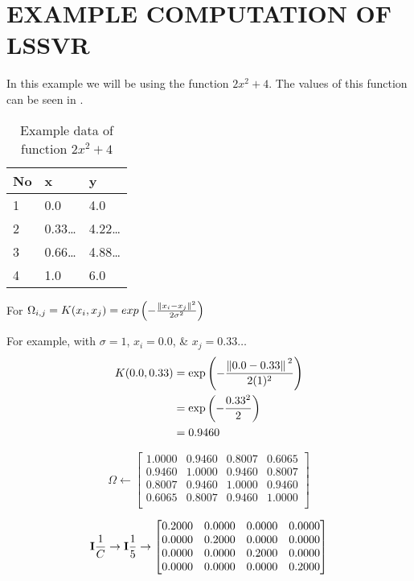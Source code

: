 \appendix

\chapter{EXAMPLE COMPUTATION OF LSSVR}
In this example we will be using the function \(2x^2+4\). The values of this function can be seen in .

\begin{table}[H]
  \centering
  \begin{tabular}{@{}lll@{}}
    \toprule
    No & x          & y          \\ \midrule
    1  & 0.0        & 4.0        \\
    2  & 0.33\ldots & 4.22\ldots \\
    3  & 0.66\ldots & 4.88\ldots \\
    4  & 1.0        & 6.0        \\
    \bottomrule
  \end{tabular}
  \caption{Example data of function \(2x^2+4\)}\label{table:lssvr_example_function_values}
\end{table}
For \(\Omega_{i,j}=K(x_i,x_j)=exp \left(-\frac{\norm*{x_i-x_j}^2}{2\sigma^2}\right)\)

For example, with \(\sigma=1\), \(x_i=0.0\), \& \(x_j = 0.33\dots\)
\begin{equation}
  \begin{split}
    K(0.0,0.33) & = \exp\left(-\frac{\norm*{0.0-0.33}^2}{2(1)^2}\right) \\
                & = \exp\left(-\frac{0.33^2}{2}\right)                  \\
                & = 0.9460
  \end{split}
\end{equation}

\begin{equation}
  \Omega\gets
  \begin{bmatrix}
    1.0000 & 0.9460 & 0.8007 & 0.6065 \\
    0.9460 & 1.0000 & 0.9460 & 0.8007 \\
    0.8007 & 0.9460 & 1.0000 & 0.9460 \\
    0.6065 & 0.8007 & 0.9460 & 1.0000 \\
  \end{bmatrix}
\end{equation}

\begin{equation}
  \vb{I}\frac{1}{C}\to\vb{I}\frac{1}{5}\to
  \begin{bmatrix}
    0.2000 & 0.0000 & 0.0000 & 0.0000 \\
    0.0000 & 0.2000 & 0.0000 & 0.0000 \\
    0.0000 & 0.0000 & 0.2000 & 0.0000 \\
    0.0000 & 0.0000 & 0.0000 & 0.2000
  \end{bmatrix}
\end{equation}

